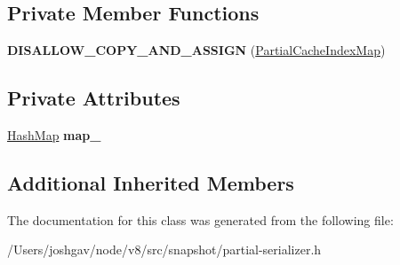 \subsection*{Private Member Functions}
\begin{DoxyCompactItemize}
\item 
{\bfseries D\+I\+S\+A\+L\+L\+O\+W\+\_\+\+C\+O\+P\+Y\+\_\+\+A\+N\+D\+\_\+\+A\+S\+S\+I\+GN} (\hyperlink{classv8_1_1internal_1_1_partial_serializer_1_1_partial_cache_index_map}{Partial\+Cache\+Index\+Map})\hypertarget{classv8_1_1internal_1_1_partial_serializer_1_1_partial_cache_index_map_a0f748b1da9ff193a47c86ce834c254b9}{}\label{classv8_1_1internal_1_1_partial_serializer_1_1_partial_cache_index_map_a0f748b1da9ff193a47c86ce834c254b9}

\end{DoxyCompactItemize}
\subsection*{Private Attributes}
\begin{DoxyCompactItemize}
\item 
\hyperlink{classv8_1_1internal_1_1_template_hash_map_impl}{Hash\+Map} {\bfseries map\+\_\+}\hypertarget{classv8_1_1internal_1_1_partial_serializer_1_1_partial_cache_index_map_a4f51940a08b292c9e3e5b9bec88dbc6e}{}\label{classv8_1_1internal_1_1_partial_serializer_1_1_partial_cache_index_map_a4f51940a08b292c9e3e5b9bec88dbc6e}

\end{DoxyCompactItemize}
\subsection*{Additional Inherited Members}


The documentation for this class was generated from the following file\+:\begin{DoxyCompactItemize}
\item 
/\+Users/joshgav/node/v8/src/snapshot/partial-\/serializer.\+h\end{DoxyCompactItemize}
